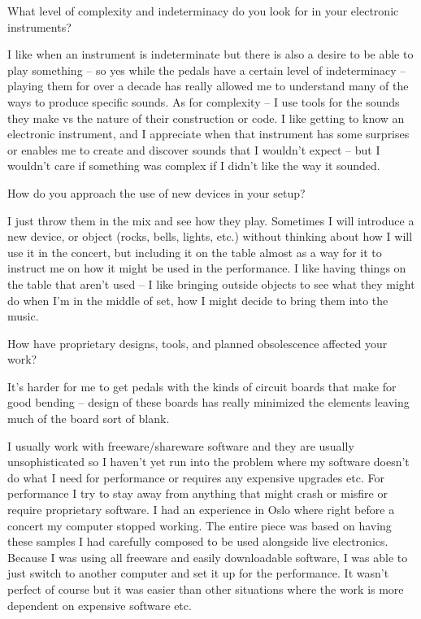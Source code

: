 What level of complexity and indeterminacy do you look for in your electronic instruments? 

I like when an instrument is indeterminate but there is also a desire to be able to play something – so yes while the pedals have a certain level of indeterminacy – playing them for over a decade has really allowed me to understand many of the ways to produce specific sounds. As for complexity – I use tools for the sounds they make vs the nature of their construction or code. I like getting to know an electronic instrument, and I appreciate when that instrument has some surprises or enables me to create and discover sounds that I wouldn’t expect – but I wouldn’t care if something was complex if I didn’t like the way it sounded. 


How do you approach the use of new devices in your setup? 

I just throw them in the mix and see how they play. Sometimes I will introduce a new device, or object (rocks, bells, lights, etc.) without thinking about how I will use it in the concert, but including it on the table almost as a way for it to instruct me on how it might be used in the performance. I like having things on the table that aren’t used – I like bringing outside objects to see what they might do when I’m in the middle of set, how I might decide to bring them into the music.

How have proprietary designs, tools, and planned obsolescence affected your work? 

It’s harder for me to get pedals with the kinds of circuit boards that make for good bending – design of these boards has really minimized the elements leaving much of the board sort of blank. 

I usually work with freeware/shareware software and they are usually unsophisticated so I haven’t yet run into the problem where my software doesn’t do what I need for performance or requires any expensive upgrades etc. For performance I try to stay away from anything that might crash or misfire or require proprietary software. I had an experience in Oslo where right before a concert my computer stopped working. The entire piece was based on having these samples I had carefully composed to be used alongside live electronics. Because I was using all freeware and easily downloadable software, I was able to just switch to another computer and set it up for the performance. It wasn’t perfect of course but it was easier than other situations where the work is more dependent on expensive software etc. 

